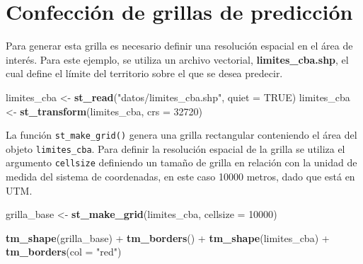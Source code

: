 \documentclass[11pt,b5paper,]{krantz}
\newenvironment{Shaded}{}{}
\newcommand{\KeywordTok}[1]{\textcolor[rgb]{0.00,0.44,0.13}{\textbf{#1}}}
\newcommand{\DataTypeTok}[1]{\textcolor[rgb]{0.56,0.13,0.00}{#1}}
\newcommand{\DecValTok}[1]{\textcolor[rgb]{0.25,0.63,0.44}{#1}}
\newcommand{\StringTok}[1]{\textcolor[rgb]{0.25,0.44,0.63}{#1}}
\newcommand{\OtherTok}[1]{\textcolor[rgb]{0.00,0.44,0.13}{#1}}
\newcommand{\OperatorTok}[1]{\textcolor[rgb]{0.40,0.40,0.40}{#1}}
\newcommand{\NormalTok}[1]{#1}
\begin{document}
\section{Confección de grillas de
predicción}\label{confecciuxf3n-de-grillas-de-predicciuxf3n}

Para generar esta grilla es necesario definir una resolución espacial en
el área de interés. Para este ejemplo, se utiliza un archivo vectorial,
\textbf{limites\_cba.shp}, el cual define el límite del territorio sobre
el que se desea predecir.

\begin{Shaded}
\begin{Highlighting}[]
\NormalTok{limites_cba <-}\StringTok{ }\KeywordTok{st_read}\NormalTok{(}\StringTok{"datos/limites_cba.shp"}\NormalTok{,}
                       \DataTypeTok{quiet =} \OtherTok{TRUE}\NormalTok{)}
\NormalTok{limites_cba <-}\StringTok{ }\KeywordTok{st_transform}\NormalTok{(limites_cba, }
                            \DataTypeTok{crs =} \DecValTok{32720}\NormalTok{)}
\end{Highlighting}
\end{Shaded}

La función \texttt{st\_make\_grid()} genera una grilla rectangular
conteniendo el área del objeto \texttt{limites\_cba}. Para definir la
resolución espacial de la grilla se utiliza el argumento
\texttt{cellsize} definiendo un tamaño de grilla en relación con la
unidad de medida del sistema de coordenadas, en este caso 10000 metros,
dado que está en UTM.

\begin{Shaded}
\begin{Highlighting}[]
\NormalTok{grilla_base <-}\StringTok{ }\KeywordTok{st_make_grid}\NormalTok{(limites_cba, }
                            \DataTypeTok{cellsize =} \DecValTok{10000}\NormalTok{)}

\KeywordTok{tm_shape}\NormalTok{(grilla_base) }\OperatorTok{+}
\StringTok{  }\KeywordTok{tm_borders}\NormalTok{() }\OperatorTok{+}
\StringTok{  }\KeywordTok{tm_shape}\NormalTok{(limites_cba) }\OperatorTok{+}
\StringTok{  }\KeywordTok{tm_borders}\NormalTok{(}\DataTypeTok{col =} \StringTok{"red"}\NormalTok{)}
\end{Highlighting}
\end{Shaded}
\end{document}
